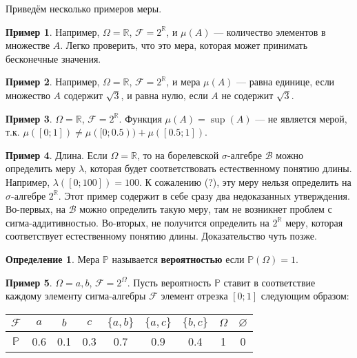 \documentclass[pdftex, 12pt, a4paper]{article}
\def \mbb{\mathbb}
\def \PP{\mbb{P}}
\def\R{\ensuremath{\mathbb{R}}} %
\def\F{\ensuremath{\mathcal{F}}} %
\def\B{\ensuremath{\mathcal{B}}} %
\def\s{\ensuremath{\sigma}}
\def \Om{\Omega}
\theoremstyle{definition} %
\newtheorem*{mydef}{Определение}
\newtheorem{myex}{Пример}
\numberwithin{problem}{section}
\newcommand{\indef}[1]{\textbf{#1}}
\numberwithin{blits}{section}
\begin{document}
Приведём несколько примеров меры.
\begin{myex} Например, $\Omega=\mathbb{R}$, $\mathcal{F}=2^{\mathbb{R}}$, и $\mu(A)$ --- количество элементов в множестве $A$. Легко проверить, что это мера, которая может принимать бесконечные значения.
\end{myex}

\begin{myex} Например, $\Omega=\mathbb{R}$, $\mathcal{F}=2^{\mathbb{R}}$, и мера $\mu(A)$ --- равна единице, если множество $A$ содержит $\sqrt{3}$, и равна нулю, если $A$ не содержит $\sqrt{3}$.
\end{myex}

\begin{myex} $\Omega=\mathbb{R}$, $\mathcal{F}=2^{\mathbb{R}}$. Функция $\mu(A)=\sup(A)$ --- не является мерой, т.к. $\mu([0;1])\neq \mu([0;0.5))+\mu([0.5;1])$.
\end{myex}


\begin{myex} Длина. Если $\Omega=\R$, то на борелевской \s-алгебре $\B$ можно определить меру $\lambda$, которая будет соответствовать естественному понятию длины. Например, $\lambda([0;100])=100$. К сожалению (?), эту меру нельзя определить на \s-алгебре $2^{\R}$. Этот пример содержит в себе сразу два недоказанных утверждения.  Во-первых, на $\B$ можно определить такую меру, там не возникнет проблем с сигма-аддитивностью. Во-вторых, не получится определить на $2^{\R}$ меру, которая соответствует естественному понятию длины. Доказательство чуть позже.
\end{myex}

\begin{mydef} Мера $\PP$ называется \indef{вероятностью} если $\PP(\Omega)=1$. 
\end{mydef}

\begin{myex}
$\Om = {a,b}$, $\F = 2^{\Om}$. Пусть вероятность $\PP$ ставит в соответствие каждому элементу сигма-алгебры $\F$ элемент отрезка $[0;1]$ следующим образом: 

\begin{table}[H]
\begin{center}
\begin{tabular}{|c|c|c|c|c|c|c|c|c|}
\hline
$\F$ & $a$ & $b$ & $c$ & $\{a,b\}$ & $\{a,c\}$ & $\{b,c\}$  & $\Om$ & $\varnothing$ \\
\hline
$\PP$ & 0.6 & 0.1 & 0.3 & 0.7 & 0.9 & 0.4 & 1 & 0 \\
\hline
\end{tabular}
\end{center}
\end{table} 



\end{myex}
\end{document}

